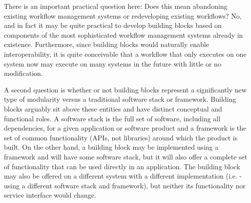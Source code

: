There is an important practical question here: Does this mean abandoning
existing workflow management systems or redeveloping existing workflows? No, and
in fact it may be quite practical to develop building blocks based on components
of the most sophisticated workflow management systems already in existence.
Furthermore, since building blocks would naturally enable interoperability, it
is quite conceivable that a workflow that only executes on one system now may
execute on many systems in the future with little or no modification. 

A second question is whether or not building blocks represent a significantly new
type of modularity versus a traditional software stack or framework. Building blocks
arguably sit above these entities and have distinct conceptual and functional roles.
A software stack is the full set of software, including all dependencies, for a given
application or software product and a framework is the set of common functionality
(APIs, not libraries) around which the product is built. On the other hand, a
building block may be implemented using a framework and will have some software stack,
but it will also offer a complete set of functionality that can be used directly in
an application. The building block may also be offered on a different system with a
different implementation (i.e. - using a different software stack and framework), but neither its functionality nor service interface would change.